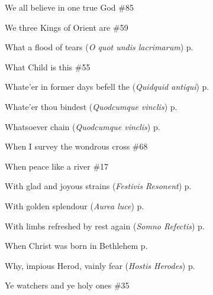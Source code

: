 \begin{hangparas}{1.25em}{1}
We all believe in one true God \dotfill \#85
\par\noindent
We three Kings of Orient are \dotfill \#59
\par\noindent
What a flood of tears (\textit{O quot undis lacrimarum}) \dotfill p. \pageref{SevenSorrowsInvitatory}
\par\noindent
What Child is this \dotfill \#55
\par\noindent
Whate'er in former days befell the (\textit{Quidquid antiqui}) \dotfill p. \pageref{BenedictInvitatory}
\par\noindent
Whate'er thou bindest (\textit{Quodcumque vinclis}) \dotfill p. \pageref{LammasInvitatory}
\par\noindent
Whatsoever chain (\textit{Quodcumque vinclis}) \dotfill p. \pageref{PeterAntiochEvensong}
\par\noindent
When I survey the wondrous cross \dotfill \#68
\par\noindent
When peace like a river \dotfill \#17
\par\noindent
With glad and joyous strains (\textit{Festivis Resonent}) \dotfill p. \pageref{PreciousBloodEvensong}
\par\noindent
With golden splendour (\textit{Aurea luce}) \dotfill p. \pageref{PeterEvensong} \par\noindent
With limbs refreshed by rest again (\textit{Somno Refectis}) \dotfill p. \pageref{MondayInvitatory}
\par\noindent
When Christ was born in Bethlehem \dotfill p. \pageref{WalsinghamMattins}
\par\noindent
Why, impious Herod, vainly fear (\textit{Hostis Herodes}) \dotfill p. \pageref{EpiphanyEvensong}
\par\noindent
Ye watchers and ye holy ones \dotfill \#35
\end{hangparas}

\normalsize

